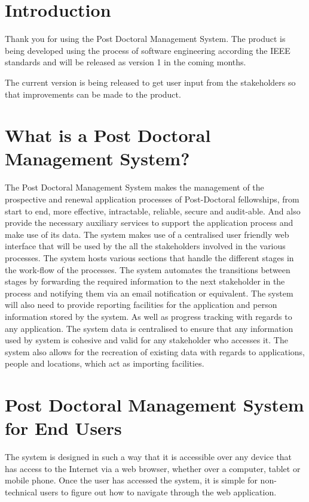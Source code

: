 \documentclass[12pt]{article}
\begin{document}
\section{Introduction}
Thank you for using the Post Doctoral Management System. The product is being developed using the process of software engineering according the IEEE standards and will be released as version 1 in the coming months.

The  current version is being released to get user input from the stakeholders so that improvements can be made to the product.

\section{What is a Post Doctoral Management System?}
The Post Doctoral Management System makes the management of the prospective and renewal application processes of Post-Doctoral fellowships, from start to end, more effective, intractable, reliable, secure and audit-able. And also provide the necessary auxiliary services to support the application process and make use of its data. The system makes use of a centralised user friendly web interface that will be used by the all the stakeholders involved in the various processes. The system hosts various sections that handle the different stages in the work-flow of the processes. The system automates the transitions between stages by forwarding the required information to the next stakeholder in the process and notifying them via an email notification or equivalent. The system will also need to provide reporting facilities for the application and person information stored by the system. As well as progress tracking with regards to any application. The system data is centralised to ensure that any information used by system is cohesive and valid for any stakeholder who accesses it. The system also allows for the recreation of existing data with regards to applications, people and locations, which act as importing facilities.

\section{Post Doctoral Management System for End Users}
The system is designed in such a way that it is accessible over any device that has access to the Internet via a web browser, whether over a computer, tablet or mobile phone. Once the user has accessed the system, it is simple for non-technical users to figure out how to navigate through the web application.
\end{document}
